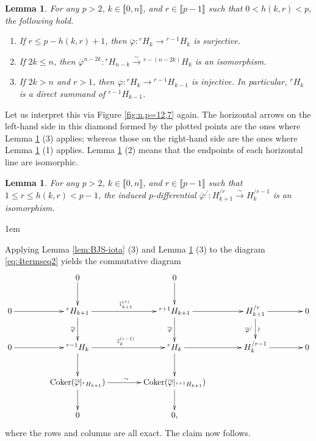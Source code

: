 \documentclass[a4paper]{amsart}
\makeatletter
\numberwithin{equation}{subsection}
\newtheorem{lemma}[theorem]{Lemma}
\theoremstyle{definition}
\newcommand{\interval}[1]{\llbracket #1 \rrbracket}
\renewenvironment{proof}[1][\proofname]{\par
	\pushQED{\qed}%
	\normalfont \topsep0\p@\@plus6\p@ \labelsep1em\relax
	\trivlist
	\item[\hskip\labelsep\bfseries #1]\ignorespaces
	\mbox{}%
}{
	\popQED\endtrivlist\@endpefalse
}
\numberwithin{equation}{subsection}
\makeatother
\begin{document}
\begin{lemma}\label{lem:BJS-del}
For any $p>2$, $k\in\interval{0,n}$, and $r\in\interval{p-1}$ such that $0<h(k,r)<p$, the following hold.
\begin{enumerate}
\item {\rm\cite[Lemma 6.6]{BJS}} If $r\leq p-h(k,r)+1$, then $\overline{\varphi} : {}^rH_k \to {}^{r-1}H_k$ is surjective.

\item {\rm\cite[Lemma 6.8]{BJS}} If $2k\leq n$, then $\overline{\varphi}^{n-2k}: {}^{r}H_{n-k} \xrightarrow{\sim} {}^{r-(n-2k)}H_k$ is an isomorphism.

\item If $2k>n$ and $r>1$, then $\overline{\varphi}: {}^{r}H_k\to {}^{r-1}H_{k-1}$ is injective.  In particular, ${}^{r}H_k$ is a direct summand of ${}^{r-1}H_{k-1}$.
\end{enumerate}
\end{lemma}

Let us interpret this via Figure \ref{fig:n,p=12,7} again.  The horizontal arrows on the left-hand side in this diamond formed by the plotted points are the ones where Lemma \ref{lem:BJS-del} (3) applies; whereas those on the right-hand side are the ones where Lemma \ref{lem:BJS-del} (1) applies.  Lemma \ref{lem:BJS-del} (2) means that the endpoints of each horizontal line are isomorphic.

\begin{lemma}\label{lem:del-on-slash}
For any $p>2$, $k\in\interval{0,n}$, and $r\in\interval{p-1}$ such that $1\leq r\leq h(k,r)< p-1$, the induced $p$-differential $\overline{\varphi}^{\slash}: H_{k+1}^{\slash r}\xrightarrow{\sim} H_k^{\slash r-1}$ is an isomorphism.
\end{lemma}
\begin{proof}
Applying Lemma \ref{lem:BJS-iota} (3) and Lemma \ref{lem:BJS-del} (3) to the diagram \eqref{eq:4termseq2} yields the commutative diagram
\[\xymatrix@C=40pt{
& 0\ar[d] & 0\ar[d] & & \\
0 \ar[r] & {}^{r}H_{k+1} \ar[d]_{\overline{\varphi}} \ar[r]^{\overline{\iota}_{k+1}^{(r)}}
 & {}^{r+1}H_{k+1} \ar[d]_{\overline{\varphi}}\ar[r]  & H_{k+1}^{\slash r}\ar[d]_{\overline{\varphi}^{\slash}}^{\wr}\ar[r]&0\\
0 \ar[r] & {}^{r-1}H_k \ar[d] \ar[r]^{\overline{\iota}_{k}^{(r-1)}}   & {}^rH_k \ar[r]\ar[d] & H_k^{\slash r-1} \ar[r] & 0 \\
&  \mathrm{Coker}(\overline{\varphi}|_{{}^rH_{k+1}}) \ar[r]^{\sim}\ar[d] & \mathrm{Coker}(\overline{\varphi}|_{{}^{r+1}H_{k+1}}) \ar[d] & & \\
& 0  & 0 ,
}\]
where the rows and columns are all exact.  The claim now follows.
\end{proof}
\end{document}

